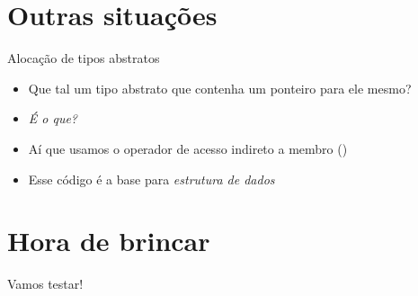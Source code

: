 \documentclass[14pt]{beamer}
\begin{document}
	\section{Outras situações}
		\begin{frame}{Alocação de tipos abstratos}
			\begin{itemize}
				\presentationPause\item Que tal um tipo abstrato que contenha um ponteiro para ele mesmo?
				\presentationPause\item \textit{É o que?}
			\end{itemize}
			\presentationPause
			\begin{itemize}
				\presentationPause\item Aí que usamos o operador de acesso indireto a membro (\basicCode{->})
				\presentationPause\item Esse código é a base para \emph{estrutura de dados}
			\end{itemize}
		\end{frame}
		
	\section{Hora de brincar}
		\begin{frame}
			\begin{center}\Huge
				Vamos testar!
			\end{center}
		\end{frame}

	
\end{document}
